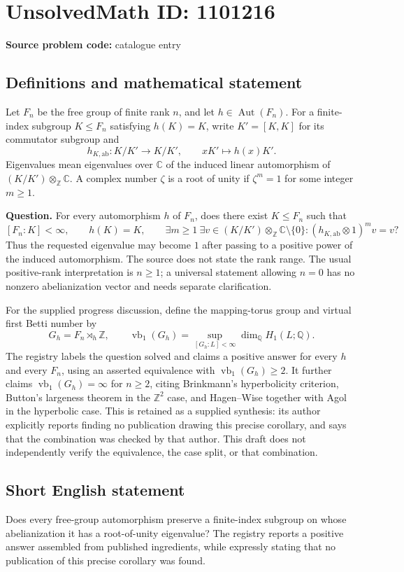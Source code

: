 \documentclass[11pt]{article}
\newcommand{\Z}{\mathbb{Z}}
\newcommand{\Q}{\mathbb{Q}}
\newcommand{\C}{\mathbb{C}}
\begin{document}
\section*{UnsolvedMath ID: 1101216}
\textbf{Source problem code:} catalogue entry
\subsection{Definitions and mathematical statement}
Let $F_n$ be the free group of finite rank $n$, and let $h\in\operatorname{Aut}(F_n)$. For a finite-index subgroup $K\leq F_n$ satisfying $h(K)=K$, write $K'=[K,K]$ for its commutator subgroup and
\[
 h_{K,\mathrm{ab}}:K/K'\longrightarrow K/K',\qquad xK'\longmapsto h(x)K'.
\]
Eigenvalues mean eigenvalues over $\C$ of the induced linear automorphism of $(K/K')\otimes_{\Z}\C$. A complex number $\zeta$ is a root of unity if $\zeta^m=1$ for some integer $m\geq1$.

\textbf{Question.} For every automorphism $h$ of $F_n$, does there exist $K\leq F_n$ such that
\[
 [F_n:K]<\infty,\qquad h(K)=K,\qquad
 \exists m\geq1\ \exists v\in(K/K')\otimes_{\Z}\C\setminus\{0\}:
 (h_{K,\mathrm{ab}}\otimes1)^m v=v?
\]
Thus the requested eigenvalue may become $1$ after passing to a positive power of the induced automorphism. The source does not state the rank range. The usual positive-rank interpretation is $n\geq1$; a universal statement allowing $n=0$ has no nonzero abelianization vector and needs separate clarification.

For the supplied progress discussion, define the mapping-torus group and virtual first Betti number by
\[
 G_h=F_n\rtimes_h\Z,\qquad
 \operatorname{vb}_1(G_h)=\sup_{[G_h:L]<\infty}\dim_{\Q}H_1(L;\Q).
\]
The registry labels the question solved and claims a positive answer for every $h$ and every $F_n$, using an asserted equivalence with $\operatorname{vb}_1(G_h)\geq2$. It further claims $\operatorname{vb}_1(G_h)=\infty$ for $n\geq2$, citing Brinkmann's hyperbolicity criterion, Button's largeness theorem in the $\Z^2$ case, and Hagen--Wise together with Agol in the hyperbolic case. This is retained as a supplied synthesis: its author explicitly reports finding no publication drawing this precise corollary, and says that the combination was checked by that author. This draft does not independently verify the equivalence, the case split, or that combination.
\subsection{Short English statement}
Does every free-group automorphism preserve a finite-index subgroup on whose abelianization it has a root-of-unity eigenvalue? The registry reports a positive answer assembled from published ingredients, while expressly stating that no publication of this precise corollary was found.
\end{document}
